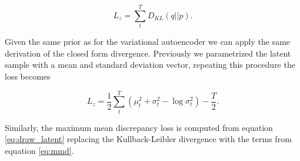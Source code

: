 \begin{equation}\label{eq:draw_latent}
L_z = \sum_t^T D_{KL}(q||p).
\end{equation}

\noindent Given the same prior as for the variational autoencoder we can apply the same derivation of the closed form divergence. Previously we parametrized the latent sample with a mean and standard deviation vector, repeating this procedure the loss becomes 

\begin{equation}\label{eq:draw_kl}
L_z = \frac{1}{2}\sum_t^T(\mu^2_t + \sigma^2_t - \log \sigma_t ^2) - \frac{T}{2}.
\end{equation}

\noindent Similarly, the maximum mean discrepancy loss is computed from equation \ref{eq:draw_latent} replacing the Kullback-Leibler divergence with the terms from equation \ref{eq:mmd}.